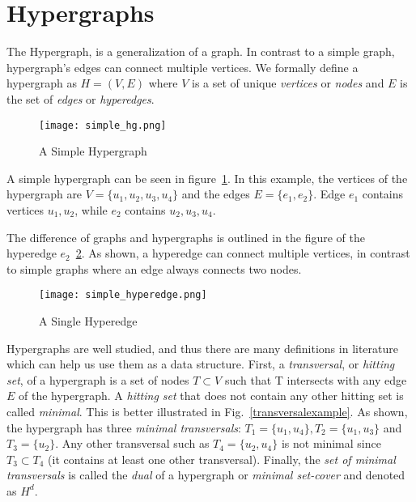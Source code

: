 
\section{Hypergraphs} %

\label{Chapter4_hg} %


The Hypergraph, is a generalization of a graph. In contrast to a simple graph, hypergraph's edges can connect multiple vertices. We formally define a hypergraph as $H = (V, E)$ where $V$ is a set of unique {\em vertices} or {\em nodes} and $E$ is the set of {\em edges} or {\em hyperedges}. 
\begin{figure}
	\texttt{[image: simple\_hg.png]}
	\caption{A Simple Hypergraph}
	\label{simplehg}
\end{figure}

A simple hypergraph can be seen in figure~\ref{simplehg}. In this example, the vertices of the hypergraph are $V = \{u_1, u_2, u_3, u_4\}$ and the edges $E = \{e_1, e_2\}$. Edge $e_1$ contains vertices $u_1, u_2$, while $e_2$ contains $u_2, u_3, u_4$.

The difference of graphs and hypergraphs is outlined in the figure of the hyperedge $e_2$~\ref{hyperedge}. As shown, a hyperedge can connect multiple vertices, in contrast to simple graphs where an edge always connects two nodes.

\begin{figure}
	\texttt{[image: simple\_hyperedge.png]}
	\caption{A Single Hyperedge}
	\label{hyperedge}
\end{figure}

Hypergraphs are well studied, and thus there are many definitions in literature which can help us use them as a data structure. First, a {\em transversal}, or {\em hitting set}, of a hypergraph is a set of nodes $T \subset V$ such that T intersects with any edge $E$ of the hypergraph. A {\em hitting set} that does not contain any other hitting set is called {\em minimal}. This is better illustrated in Fig.~\ref{transversalexample}. As shown, the hypergraph has three {\em minimal transversals}: $T_1 = \{u_1, u_4\}, T_2 = \{u_1, u_3\}$ and $T_3 = \{u_2\}$. Any other transversal such as $T_4 = \{u_2, u_4\}$ is not minimal since $T_3 \subset T_4$ (it contains at least one other transversal). Finally, the {\em set of minimal transversals} is called the {\em dual} of a hypergraph or {\em minimal set-cover} and denoted as $H^d$. 

